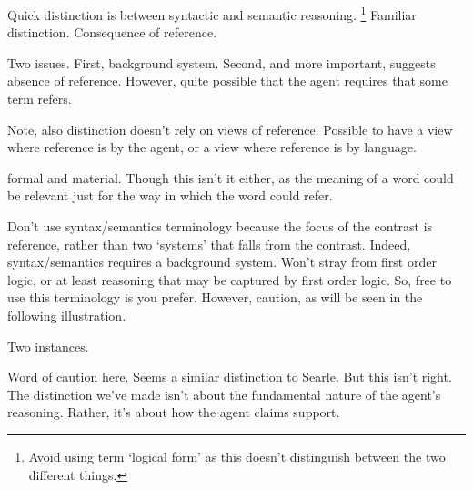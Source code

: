\begin{note}
  Quick distinction is between syntactic and semantic reasoning.\nolinebreak
  \footnote{
    Avoid using term `logical form' as this doesn't distinguish between the two different things.
  }
  Familiar distinction.
  Consequence of reference.

  Two issues.
  First, background system.
  Second, and more important, suggests absence of reference.
  However, quite possible that the agent requires that some term refers.

  Note, also distinction doesn't rely on views of reference.
  Possible to have a view where reference is by the agent, or a view where reference is by language.
\end{note}

\begin{note}
  \cite{Beall:2019ty} formal and material.
  Though this isn't it either, as the meaning of a word could be relevant just for the way in which the word could refer.
\end{note}

\begin{note}
Don't use syntax/semantics terminology because the focus of the contrast is reference, rather than two `systems' that falls from the contrast.
Indeed, syntax/semantics requires a background system.
Won't stray from first order logic, or at least reasoning that may be captured by first order logic.
So, free to use this terminology is you prefer.
However, caution, as will be seen in the following illustration.
\end{note}

\begin{note}
  Two instances.
\end{note}

\begin{note}[Searle]
  Word of caution here.
  Seems a similar distinction to Searle.
  But this isn't right.
  The distinction we've made isn't about the fundamental nature of the agent's reasoning.
  Rather, it's about how the agent claims support.
\end{note}

